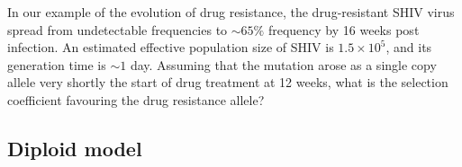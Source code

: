 \begin{question}
In our example of the evolution of drug resistance, the drug-resistant SHIV virus spread from undetectable frequencies to $\sim 65\%$ frequency by 16 weeks post infection. An estimated effective population size of SHIV is $1.5 \times 10^5$, and its generation time is $\sim 1$ day. Assuming that the mutation arose as a single copy allele very shortly the start of drug treatment at 12 weeks, what is the selection coefficient favouring the drug resistance allele?  
\end{question}







\subsection{Diploid model}

